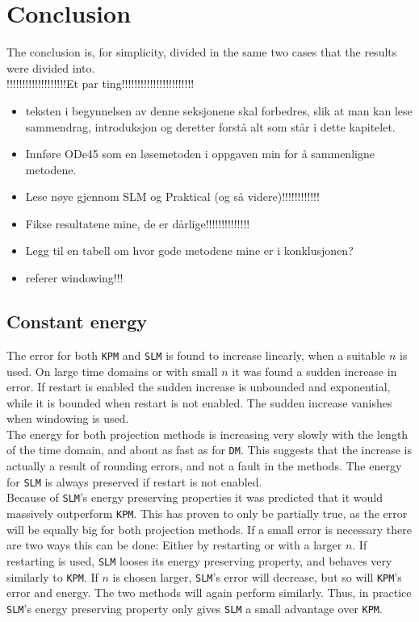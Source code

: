 \chapter{ Conclusion }
The conclusion is, for simplicity, divided in the same two cases that the results were divided into. \\



!!!!!!!!!!!!!!!!!!!Et par ting!!!!!!!!!!!!!!!!!!!!!!!\\
\begin{itemize}
\item teksten i begynnelsen av denne seksjonene skal forbedres, slik at man kan lese sammendrag, introduksjon og deretter forstå alt som står i dette kapitelet.
\item Innføre ODe45 som en løsemetoden i oppgaven min for å sammenligne metodene.
\item Lese nøye gjennom SLM og Praktical (og så videre)!!!!!!!!!!!!
\item Fikse resultatene mine, de er dårlige!!!!!!!!!!!!!!
\item Legg til en tabell om hvor gode metodene mine er i konklusjonen?
\item referer windowing!!!
\end{itemize}
\section{Constant energy} %
The error for both \texttt{KPM} and \texttt{SLM} is found to increase linearly, when a suitable $n$ is used. On large time domains or with small $n$ it was found a sudden increase in error. If restart is enabled the sudden increase is unbounded and exponential, while it is bounded when restart is not enabled.
The sudden increase vanishes when windowing is used. \\

\noindent The energy for both projection methods is increasing very slowly with the length of the time domain, and about as fast as for \texttt{DM}. This suggests that the increase is actually a result of rounding errors, and not a fault in the methods. The energy for \texttt{SLM} is always preserved if restart is not enabled.\\

\noindent Because of \texttt{SLM}'s energy preserving properties it was predicted that it would massively outperform \texttt{KPM}. This has proven to only be partially true, as the error will be equally big for both projection methods.
If a small error is necessary there are two ways this can be done: Either by restarting or with a larger $n$. If restarting is used, \texttt{SLM} looses its energy preserving property, and behaves very similarly to \texttt{KPM}. If $n$ is chosen larger, \texttt{SLM}'s error will decrease, but so will \texttt{KPM}'s error and energy. The two methods will again perform similarly. Thus, in practice \texttt{SLM}'s energy preserving property only gives \texttt{SLM} a small advantage over \texttt{KPM}.\\

